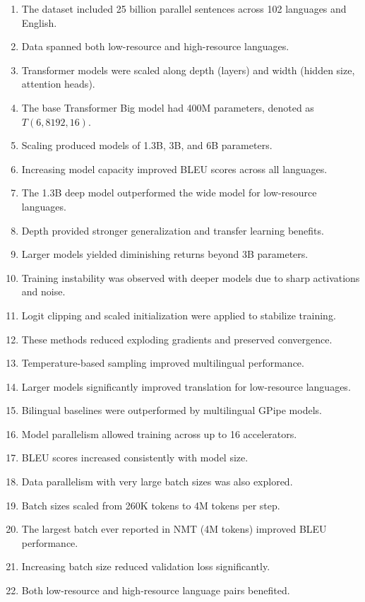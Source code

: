 \documentclass[12pt]{article}
\begin{document}
\begin{enumerate}
  \item The dataset included 25 billion parallel sentences across 102 languages and English.  
  \item Data spanned both low-resource and high-resource languages.  
  \item Transformer models were scaled along depth (layers) and width (hidden size, attention heads).  
  \item The base Transformer Big model had 400M parameters, denoted as $T(6,8192,16)$.  
  \item Scaling produced models of 1.3B, 3B, and 6B parameters.  
  \item Increasing model capacity improved BLEU scores across all languages.  
  \item The 1.3B deep model outperformed the wide model for low-resource languages.  
  \item Depth provided stronger generalization and transfer learning benefits.  
  \item Larger models yielded diminishing returns beyond 3B parameters.  
  \item Training instability was observed with deeper models due to sharp activations and noise.  
  \item Logit clipping and scaled initialization were applied to stabilize training.  
  \item These methods reduced exploding gradients and preserved convergence.  
  \item Temperature-based sampling improved multilingual performance.  
  \item Larger models significantly improved translation for low-resource languages.  
  \item Bilingual baselines were outperformed by multilingual GPipe models.  
  \item Model parallelism allowed training across up to 16 accelerators.  
  \item BLEU scores increased consistently with model size.  
  \item Data parallelism with very large batch sizes was also explored.  
  \item Batch sizes scaled from 260K tokens to 4M tokens per step.  
  \item The largest batch ever reported in NMT (4M tokens) improved BLEU performance.  
  \item Increasing batch size reduced validation loss significantly.  
  \item Both low-resource and high-resource language pairs benefited.  

\end{enumerate}
\end{document}
